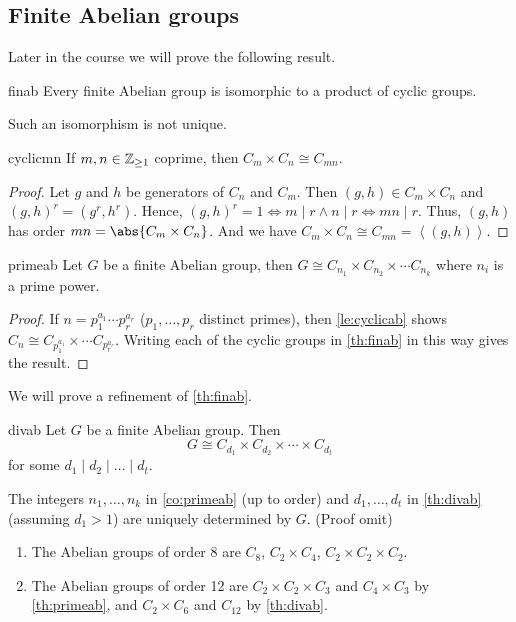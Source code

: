 \subsection{Finite Abelian groups}
Later in the course we will prove the following result.
\begin{theorem}{}{finab}
    Every finite Abelian group is isomorphic to a product of cyclic groups.
\end{theorem}
\begin{note}
    Such an isomorphism is not unique.
\end{note}
\begin{lemma}{}{cyclicmn}
    If \(m, n \in \mathbb{\MakeUppercase{Z}}_{\geq 1}\) coprime, then \(C_m \times C_n \cong C_{mn}\).
\end{lemma}
\begin{proof}
    Let \(g\) and \(h\) be generators of \(C_n\) and \(C_m\). Then \((g, h) \in C_m \times C_n\) and \((g, h)^r = (g^r, h^r)\). Hence, \((g, h)^r = 1 \iff m \mid r \land n \mid r \iff mn \mid r\). Thus, \((g,h)\) has order \(mn = \abs{C_m \times C_n} \). And we have \( C_m \times C_n \cong C_{mn} = \left\langle(g,h)\right\rangle \).
\end{proof}
\begin{corollary}{}{primeab}
    Let \(G\) be a finite Abelian group, then \(G \cong C_{n_1} \times C_{n_2} \times \cdots C_{n_k}\) where \(n_i\) is a prime power.
\end{corollary}
\begin{proof}
    If \(n = p_1^{a_1}\cdots p_r^{a_r}\) (\(p_1,\ldots,p_r\) distinct primes), then \cref{le:cyclicab} shows \(C_n \cong C_{p_1^{a_1}}\times \cdots C_{p_r^{a_r}}\). Writing each of the cyclic groups in \cref{th:finab} in this way gives the result.
\end{proof}
We will prove a refinement of \cref{th:finab}.
\begin{theorem}{}{divab}
    Let \(G\) be a finite Abelian group. Then
    \[G \cong C_{d_1}\times C_{d_2} \times \cdots \times C_{d_t}\]
    for some \(d_1 \mid d_2 \mid \dots \mid d_t\).
\end{theorem}
\begin{remark}
    The integers \(n_1, \ldots, n_k\) in \cref{co:primeab} (up to order) and \(d_1, \ldots, d_t\) in \cref{th:divab} (assuming \(d_1 > 1\)) are uniquely determined by \(G\). (Proof omit)
\end{remark}
\begin{example}
    \leavevmode
    \begin{enumerate}
        \item The Abelian groups of order 8 are \(C_8\), \(C_2 \times C_4\), \(C_2 \times C_2 \times C_2\).
        \item The Abelian groups of order 12 are \(C_2 \times C_2 \times C_3\) and \(C_4 \times C_3\) by \cref{th:primeab}, and \(C_2 \times C_6\) and \(C_{12}\) by \cref{th:divab}.
    \end{enumerate}
\end{example}
